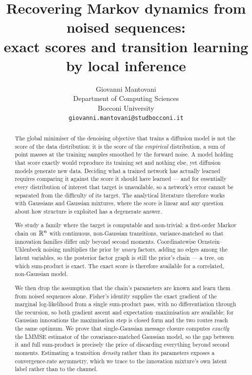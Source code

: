 \documentclass{article}
\title{Recovering Markov dynamics from noised sequences:\\
exact scores and transition learning by local inference}
\author{%
  Giovanni Mantovani \\
  Department of Computing Sciences \\
  Bocconi University \\
  \texttt{giovanni.mantovani@studbocconi.it}
}
\begin{document}
\maketitle

\begin{center}
\end{center}

\begin{abstract}
The global minimiser of the denoising objective that trains a diffusion model is not the score of
the data distribution: it is the score of the \emph{empirical} distribution, a sum of point masses
at the training samples smoothed by the forward noise. A model holding that score exactly would
reproduce its training set and nothing else, yet diffusion models generate new data. Deciding what
a trained network has actually learned requires comparing it against the score it should have
learned --- and for essentially every distribution of interest that target is unavailable, so a
network's error cannot be separated from the difficulty of its target. The analytical literature
therefore works with Gaussians and Gaussian mixtures, where the score is linear and any question
about how structure is exploited has a degenerate answer.

We study a family where the target is computable and non-trivial: a first-order Markov chain on
$\mathbb{R}^{n}$ with continuous, non-Gaussian transitions, variance-matched so that innovation
families differ only beyond second moments. Coordinatewise Ornstein--Uhlenbeck noising multiplies
the prior by \emph{unary} factors, adding no edges among the latent variables, so the posterior
factor graph is still the prior's chain --- a tree, on which sum-product is exact. The exact score
is therefore available for a correlated, non-Gaussian model.

We then drop the assumption that the chain's parameters are known and learn them from noised
sequences alone. Fisher's identity supplies the exact gradient of the marginal log-likelihood from
a single sum-product pass, with no differentiation through the recursion, so both gradient ascent
and expectation--maximisation are available; for Gaussian innovations the maximisation step is
closed form and the two routes reach the same optimum. We prove that single-Gaussian message
closure computes \emph{exactly} the LMMSE estimator of the covariance-matched Gaussian model, so
the gap between it and full sum-product is precisely the price of discarding everything beyond
second moments. Estimating a transition \emph{density} rather than its parameters exposes a
convergence-rate asymmetry, which we trace to the innovation mixture's own latent label rather
than to the channel.


\end{abstract}
\end{document}
